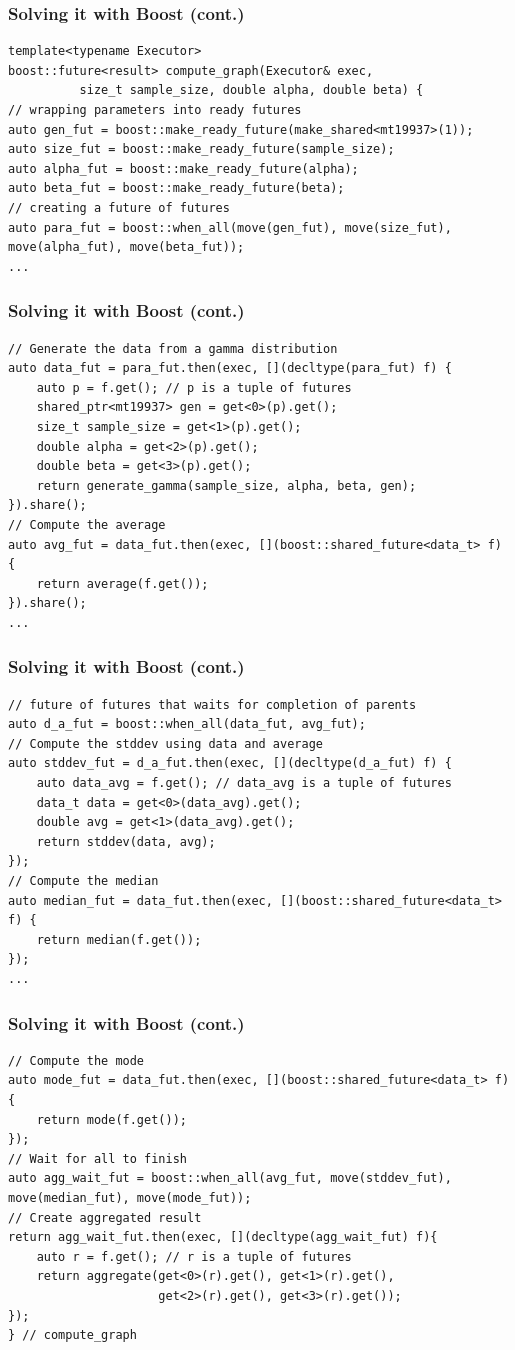 \documentclass[12pt,aspectratio=169]{beamer}
\begin{document}
\begin{frame}[fragile]
\frametitle{Solving it with Boost (cont.)}
\begin{lstlisting}
template<typename Executor>
boost::future<result> compute_graph(Executor& exec, 
          size_t sample_size, double alpha, double beta) {
// wrapping parameters into ready futures
auto gen_fut = boost::make_ready_future(make_shared<mt19937>(1));
auto size_fut = boost::make_ready_future(sample_size);
auto alpha_fut = boost::make_ready_future(alpha);
auto beta_fut = boost::make_ready_future(beta);
// creating a future of futures
auto para_fut = boost::when_all(move(gen_fut), move(size_fut), move(alpha_fut), move(beta_fut));
...
\end{lstlisting}
\end{frame}

\begin{frame}[fragile]
\frametitle{Solving it with Boost (cont.)}
\begin{lstlisting}
// Generate the data from a gamma distribution
auto data_fut = para_fut.then(exec, [](decltype(para_fut) f) {
    auto p = f.get(); // p is a tuple of futures
    shared_ptr<mt19937> gen = get<0>(p).get();
    size_t sample_size = get<1>(p).get();
    double alpha = get<2>(p).get();
    double beta = get<3>(p).get();
    return generate_gamma(sample_size, alpha, beta, gen);
}).share();
// Compute the average
auto avg_fut = data_fut.then(exec, [](boost::shared_future<data_t> f) {
    return average(f.get());
}).share();
...
\end{lstlisting}
\end{frame}

\begin{frame}[fragile]
\frametitle{Solving it with Boost (cont.)}
\begin{lstlisting}
// future of futures that waits for completion of parents
auto d_a_fut = boost::when_all(data_fut, avg_fut);
// Compute the stddev using data and average
auto stddev_fut = d_a_fut.then(exec, [](decltype(d_a_fut) f) {
    auto data_avg = f.get(); // data_avg is a tuple of futures
    data_t data = get<0>(data_avg).get();
    double avg = get<1>(data_avg).get();
    return stddev(data, avg);
});
// Compute the median
auto median_fut = data_fut.then(exec, [](boost::shared_future<data_t> f) {
    return median(f.get());
});
...
\end{lstlisting}
\end{frame}

\begin{frame}[fragile]
\frametitle{Solving it with Boost (cont.)}
\begin{lstlisting}
// Compute the mode
auto mode_fut = data_fut.then(exec, [](boost::shared_future<data_t> f) {
    return mode(f.get());
});
// Wait for all to finish
auto agg_wait_fut = boost::when_all(avg_fut, move(stddev_fut), move(median_fut), move(mode_fut));
// Create aggregated result
return agg_wait_fut.then(exec, [](decltype(agg_wait_fut) f){
    auto r = f.get(); // r is a tuple of futures
    return aggregate(get<0>(r).get(), get<1>(r).get(), 
                     get<2>(r).get(), get<3>(r).get());
});
} // compute_graph
\end{lstlisting}
\end{frame}
\end{document}
